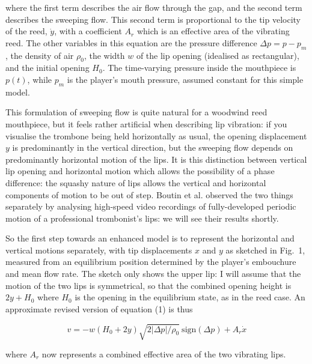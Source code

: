   \noindent{}where the first term describes the air flow through the gap, and 
  the second term describes the sweeping flow. This second term is proportional 
  to the tip velocity of the reed, $\dot{y}$, with a coefficient $A_r$ which is 
  an effective area of the vibrating reed. The other variables in this equation 
  are the pressure difference $\Delta p = p-p_m$, the density of air $\rho_0$, 
  the width $w$ of the lip opening (idealised as rectangular), and the initial 
  opening $H_0$. The time-varying pressure inside the mouthpiece is $p(t)$, 
  while $p_m$ is the player's mouth pressure, assumed constant for this simple 
  model. 

  This formulation of sweeping flow is quite natural for a woodwind reed 
  mouthpiece, but it feels rather artificial when describing lip vibration: if 
  you visualise the trombone being held horizontally as usual, the opening 
  displacement $y$ is predominantly in the vertical direction, but the sweeping 
  flow depends on predominantly horizontal motion of the lips. It is this 
  distinction between vertical lip opening and horizontal motion which allows 
  the possibility of a phase difference: the squashy nature of lips allows the 
  vertical and horizontal components of motion to be out of step. Boutin et al. 
  observed the two things separately by analysing high-speed video recordings 
  of fully-developed periodic motion of a professional trombonist's lips: we 
  will see their results shortly. 

  So the first step towards an enhanced model is to represent the horizontal 
  and vertical motions separately, with tip displacements $x$ and $y$ as 
  sketched in Fig.\ 1, measured from an equilibrium position determined by the 
  player's embouchure and mean flow rate. The sketch only shows the upper lip: 
  I will assume that the motion of the two lips is symmetrical, so that the 
  combined opening height is $2y+H_0$ where $H_0$ is the opening in the 
  equilibrium state, as in the reed case. An approximate revised version of 
  equation (1) is thus 

  \begin{equation*}v=-w(H_0+2y) \sqrt{2 |\Delta p|/\rho_0} \mathrm{~sign} 
  (\Delta p)+A_r \dot{x} \tag{2}\end{equation*} 

  \noindent{}where $A_r$ now represents a combined effective area of the two 
  vibrating lips. 


